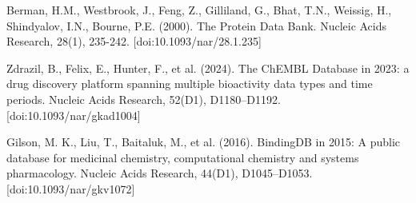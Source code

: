 \documentclass[11pt, a4paper]{article}
\begin{document}
\begin{thebibliography}{3}
Berman, H.M., Westbrook, J., Feng, Z., Gilliland, G., Bhat, T.N., Weissig, H., Shindyalov, I.N., Bourne, P.E. (2000). The Protein Data Bank. Nucleic Acids Research, 28(1), 235-242. 
[doi:10.1093/nar/28.1.235]

Zdrazil, B., Felix, E., Hunter, F., et al. (2024). The ChEMBL Database in 2023: a drug discovery platform spanning multiple bioactivity data types and time periods. Nucleic Acids Research, 52(D1), D1180–D1192. 
[doi:10.1093/nar/gkad1004]

Gilson, M. K., Liu, T., Baitaluk, M., et al. (2016). BindingDB in 2015: A public database for medicinal chemistry, computational chemistry and systems pharmacology. Nucleic Acids Research, 44(D1), D1045–D1053. 
[doi:10.1093/nar/gkv1072]

\end{thebibliography}
\end{document}
